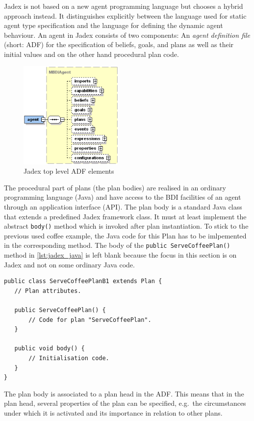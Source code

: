 Jadex is not based on a new agent programming language but chooses a hybrid approach instead.
It distinguishes explicitly between the language used for static agent type specification and the language for defining the dynamic agent behaviour.
An agent in Jadex consists of two components: An \emph{agent definition file} (short: ADF) for the specification of beliefs, goals, and plans as well as their initial values and on the other hand procedural plan code.
\begin{figure}
	\centering
	\includegraphics[height=200px]{images/jadexagentadf.png}
  \caption{Jadex top level ADF elements \cite{ActiveComponents}}
	\label{fig3}
\end{figure}
The procedural part of plans (the plan bodies) are realised in an ordinary programming language (Java) and have access to the BDI facilities of an agent through an application interface (API).
The plan body is a standard Java class that extends a predefined Jadex framework class.
It must at least implement the abstract \texttt{body()} method which is invoked after plan instantiation. To stick to the previous used coffee example, the Java code for this Plan has to be imlpemented in the corresponding method. The body of the \texttt{public ServeCoffeePlan()} method in \autoref{lst:jadex_java} is left blank because the focus in this section is on Jadex and not on some ordinary Java code. 
\begin{lstlisting}[caption={Jadex Java class}, label=lst:jadex_java]
public class ServeCoffeePlanB1 extends Plan {
   // Plan attributes.

   public ServeCoffeePlan() {
       // Code for plan "ServeCoffeePlan".
   }

   public void body() {
       // Initialisation code.
   }
}
\end{lstlisting}
The plan body is associated to a plan head in the ADF.
This means that in the plan head, several properties of the plan can be specified, e.g.\ the circumstances under which it is activated and its importance in relation to other plans.
